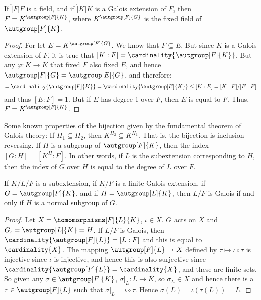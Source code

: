 \documentclass{article}                                                        %
\begin{document}
        \begin{theorem}
            If $\ring[F]{F}$ is a field, and if $\ring[K]{K}$ is a Galois
            extension of $F$, then $F=K^{\autgroup[F]{K}}$, where
            $K^{\autgroup[F]{G}}$ is the fixed field of $\autgroup[F]{K}$.
        \end{theorem}
        \begin{proof}
            For let $E=K^{\autgroup[F]{G}}$. We know that $F\subseteq{E}$.
            But since $K$ is a Galois extension of $F$, it is true that
            $[K:F]=\cardinality{\autgroup[F]{K}}$. But any
            $\varphi:K\rightarrow{K}$ that fixed $F$ also fixed $E$, and hence
            $\autgroup[F]{G}=\autgroup[E]{G}$, and therefore:
            \begin{equation}
                [K:F]=\cardinality{\autgroup[F]{K}}
                    =\cardinality{\autgroup[E]{K}}
                    \leq[K:E]=[K:F]/[E:F]
            \end{equation}
            and thus $[E:F]=1$. But if $E$ has degree 1 over $F$, then
            $E$ is equal to $F$. Thus, $F=K^{\autgroup[F]{K}}$.
        \end{proof}
        Some known properties of the bijection given by the fundamental theorem
        of Galois theory: If $H_{1}\subseteq{H}_{2}$, then
        $K^{H_{2}}\subseteq{K}^{H_{1}}$. That is, the bijection is inclusion
        reversing. If $H$ is a subgroup of $\autgroup[F]{K}$, then
        the index $[G:H]=[K^{H}:F]$. In other words, if $L$ is the
        subextension corresponding to $H$, then the index of $G$ over $H$ is
        equal to the degree of $L$ over $F$.
        \begin{theorem}
            If $K/L/F$ is a subextension, if $K/F$ is a finite Galois extension,
            if $G=\autgroup[F]{K}$, and if $H=\autgroup[L]{K}$, then
            $L/F$ is Galois if and only if $H$ is a normal subgroup of $G$.
        \end{theorem}
        \begin{proof}
            Let $X=\homomorphisms[F]{L}{K}$, $\iota\in{X}$. $G$ acts on $X$ and
            $G_{\iota}=\autgroup[L]{K}=H$. If $L/F$ is Galois, then
            $\cardinality{\autgroup[F]{L}}=[L:F]$ and this is equal to
            $\cardinality{X}$. The mapping $\autgroup[F]{L}\rightarrow{X}$
            defined by $\tau\mapsto\iota\circ\tau$ is injective since $\iota$
            is injective, and hence this is also surjective since
            $\cardinality{\autgroup[F]{L}}=\cardinality{X}$, and these are
            finite sets. So given any $\sigma\in\autgroup[F]{K}$,
            $\sigma|_{L}:L\rightarrow{K}$, so $\sigma_{L}\in{X}$ and hence
            there is a $\tau\in\autgroup[F]{L}$ such that
            $\sigma|_{L}=\iota\circ\tau$. Hence $\sigma(L)=\iota(\tau(L))=L$.
        \end{proof}
\end{document}
